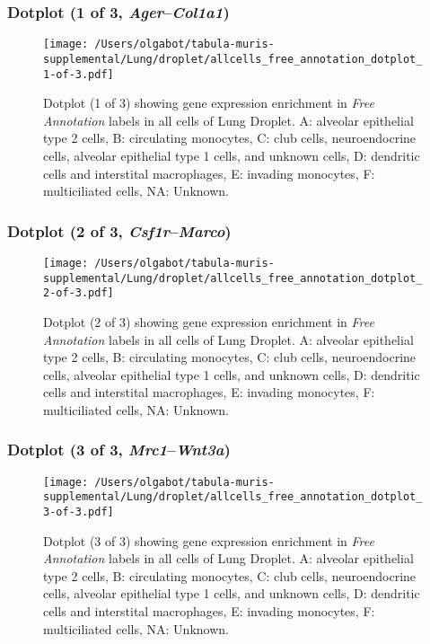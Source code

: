 \clearpage

\subsubsection{Dotplot (1 of 3, \emph{Ager}--\emph{Col1a1})}
\begin{figure}[h]
\centering
\texttt{[image: /Users/olgabot/tabula-muris-supplemental/Lung/droplet/allcells\_free\_annotation\_dotplot\_1-of-3.pdf]}

\caption{ Dotplot (1 of 3)  showing gene expression enrichment in \emph{Free Annotation} labels in all cells of Lung Droplet. A: alveolar epithelial type 2 cells, B: circulating monocytes, C: club cells, neuroendocrine cells, alveolar epithelial type 1 cells, and unknown cells, D: dendritic cells and interstital macrophages, E: invading monocytes, F: multiciliated cells, NA: Unknown.}
\end{figure}


\clearpage

\subsubsection{Dotplot (2 of 3, \emph{Csf1r}--\emph{Marco})}
\begin{figure}[h]
\centering
\texttt{[image: /Users/olgabot/tabula-muris-supplemental/Lung/droplet/allcells\_free\_annotation\_dotplot\_2-of-3.pdf]}

\caption{ Dotplot (2 of 3)  showing gene expression enrichment in \emph{Free Annotation} labels in all cells of Lung Droplet. A: alveolar epithelial type 2 cells, B: circulating monocytes, C: club cells, neuroendocrine cells, alveolar epithelial type 1 cells, and unknown cells, D: dendritic cells and interstital macrophages, E: invading monocytes, F: multiciliated cells, NA: Unknown.}
\end{figure}


\clearpage

\subsubsection{Dotplot (3 of 3, \emph{Mrc1}--\emph{Wnt3a})}
\begin{figure}[h]
\centering
\texttt{[image: /Users/olgabot/tabula-muris-supplemental/Lung/droplet/allcells\_free\_annotation\_dotplot\_3-of-3.pdf]}

\caption{ Dotplot (3 of 3)  showing gene expression enrichment in \emph{Free Annotation} labels in all cells of Lung Droplet. A: alveolar epithelial type 2 cells, B: circulating monocytes, C: club cells, neuroendocrine cells, alveolar epithelial type 1 cells, and unknown cells, D: dendritic cells and interstital macrophages, E: invading monocytes, F: multiciliated cells, NA: Unknown.}
\end{figure}


